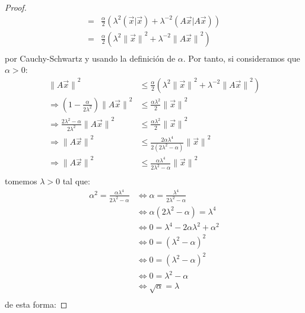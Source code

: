 \documentclass[12pt]{report}
\theoremstyle{largebreak}
\newcommand\pint[2]{\ensuremath{\left(#1\big|#2\right)}}
\newcommand\norm[1]{\ensuremath{\|#1\|}}
\begin{document}
\begin{proof}
\begin{equation*}
\begin{split}
                =&\frac{\alpha}{2}(\lambda^2\pint{\vec{x}}{\vec{x}}+\lambda^{-2}\pint{A\vec{x}}{A\vec{x}})\\
                =&\frac{\alpha}{2}(\lambda^2\norm{\vec{x}}^2+\lambda^{-2}\norm{A\vec{x}}^2)\\
            \end{split}
        \end{equation*}
        por Cauchy-Schwartz y usando la definición de $\alpha$. Por tanto, si consideramos que $\alpha>0$:
        \begin{equation*}
            \begin{split}
                \norm{A\vec{x}}^2&\leq\frac{\alpha}{2}(\lambda^2\norm{\vec{x}}^2+\lambda^{-2}\norm{A\vec{x}}^2)\\
                \Rightarrow \left(1-\frac{\alpha}{2\lambda^2}\right)\norm{A\vec{x}}^2&\leq\frac{\alpha\lambda^2}{2}\norm{\vec{x}}^2\\
                \Rightarrow \frac{2\lambda^2-\alpha}{2\lambda^2}\norm{A\vec{x}}^2&\leq\frac{\alpha\lambda^2}{2}\norm{\vec{x}}^2\\
                \Rightarrow \norm{A\vec{x}}^2&\leq\frac{2\alpha\lambda^4}{2(2\lambda^2-\alpha)}\norm{\vec{x}}^2\\
                \Rightarrow \norm{A\vec{x}}^2&\leq\frac{\alpha\lambda^4}{2\lambda^2-\alpha}\norm{\vec{x}}^2\\
            \end{split}
        \end{equation*}
        tomemos $\lambda>0$ tal que:
        \begin{equation*}
            \begin{split}
                \alpha^2=\frac{\alpha\lambda^4}{2\lambda^2-\alpha}&\iff\alpha=\frac{\lambda^4}{2\lambda^2-\alpha}\\
                &\iff\alpha(2\lambda^2-\alpha)=\lambda^4\\
                &\iff0=\lambda^4-2\alpha\lambda^2+\alpha^2\\
                &\iff0=\left(\lambda^2-\alpha\right)^2 \\
                &\iff0=\left(\lambda^2-\alpha\right)^2 \\
                &\iff0=\lambda^2-\alpha \\
                &\iff\sqrt{\alpha}=\lambda \\
            \end{split}
        \end{equation*}
        de esta forma:

\end{proof}
\end{document}
